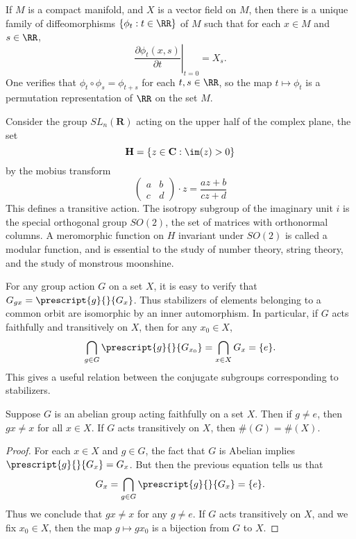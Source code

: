 \begin{example}
    If $M$ is a compact manifold, and $X$ is a vector field on $M$, then there is a unique family of diffeomorphisms $\{ \phi_t: t \in \RR \}$ of $M$ such that for each $x \in M$ and $s \in \RR$,
    \[ \left. \frac{\partial \phi_t(x,s)}{\partial t} \right|_{t = 0} = X_s. \]
    One verifies that $\phi_t \circ \phi_s = \phi_{t + s}$ for each $t,s \in \RR$, so the map $t \mapsto \phi_t$ is a permutation representation of $\RR$ on the set $M$.
\end{example}

\begin{example}
    Consider the group $SL_n(\mathbf{R})$ acting on the upper half of the complex plane, the set
    \[ \mathbf{H} = \{ z \in \mathbf{C} : \im(z) > 0 \} \]
    by the mobius transform
    \[\begin{pmatrix} a & b \\ c & d \end{pmatrix} \cdot z = \frac{az + b}{cz + d}\]
    This defines a transitive action. The isotropy subgroup of the imaginary unit $i$ is the special orthogonal group $SO(2)$, the set of matrices with orthonormal columns. A meromorphic function on $H$ invariant under $SO(2)$ is called a modular function, and is essential to the study of number theory, string theory, and the study of monstrous moonshine.
\end{example}

For any group action $G$ on a set $X$, it is easy to verify that $G_{gx} = \prescript{g}{}{G_x}$. Thus stabilizers of elements belonging to a common orbit are isomorphic by an inner automorphism. In particular, if $G$ acts faithfully and transitively on $X$, then for any $x_0 \in X$,
%
\[ \bigcap_{g \in G} \prescript{g}{}{G_{x_0}} = \bigcap_{x \in X} G_x = \{ e \}. \]
%
This gives a useful relation between the conjugate subgroups corresponding to stabilizers.

\begin{theorem}
    Suppose $G$ is an abelian group acting faithfully on a set $X$. Then if $g \neq e$, then $gx \neq x$ for all $x \in X$. If $G$ acts transitively on $X$, then $\#(G) = \#(X)$.
\end{theorem}
\begin{proof}
    For each $x \in X$ and $g \in G$, the fact that $G$ is Abelian implies $\prescript{g}{}{G_x} = G_x$. But then the previous equation tells us that
    \[ G_x = \bigcap_{g \in G} \prescript{g}{}{G_x} = \{ e \}. \]
    Thus we conclude that $gx \neq x$ for any $g \neq e$. If $G$ acts transitively on $X$, and we fix $x_0 \in X$, then the map $g \mapsto gx_0$ is a bijection from $G$ to $X$.
\end{proof}

